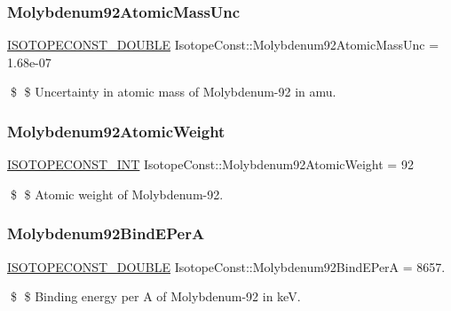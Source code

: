 \subsubsection{\texorpdfstring{Molybdenum92\+Atomic\+Mass\+Unc}{Molybdenum92AtomicMassUnc}}
{\footnotesize\ttfamily \mbox{\hyperlink{group___isotope_const-_macros_ga8f45a7272ce02c0b4c65c44636ed719a}{I\+S\+O\+T\+O\+P\+E\+C\+O\+N\+S\+T\+\_\+\+D\+O\+U\+B\+LE}} Isotope\+Const\+::\+Molybdenum92\+Atomic\+Mass\+Unc = 1.\+68e-\/07}

\$ \$ Uncertainty in atomic mass of Molybdenum-\/92 in amu. \mbox{\label{group___isotope_const-_molybdenum-_mo92_gadc9705ad39d4e885bc2bb4fad563d5ba}} 
\subsubsection{\texorpdfstring{Molybdenum92\+Atomic\+Weight}{Molybdenum92AtomicWeight}}
{\footnotesize\ttfamily \mbox{\hyperlink{group___isotope_const-_macros_ga5f18360b3e99483a35c32d789e62621c}{I\+S\+O\+T\+O\+P\+E\+C\+O\+N\+S\+T\+\_\+\+I\+NT}} Isotope\+Const\+::\+Molybdenum92\+Atomic\+Weight = 92}

\$ \$ Atomic weight of Molybdenum-\/92. \mbox{\label{group___isotope_const-_molybdenum-_mo92_ga6dbf9b16779246be7c2de275c8fbecee}} 
\subsubsection{\texorpdfstring{Molybdenum92\+Bind\+E\+PerA}{Molybdenum92BindEPerA}}
{\footnotesize\ttfamily \mbox{\hyperlink{group___isotope_const-_macros_ga8f45a7272ce02c0b4c65c44636ed719a}{I\+S\+O\+T\+O\+P\+E\+C\+O\+N\+S\+T\+\_\+\+D\+O\+U\+B\+LE}} Isotope\+Const\+::\+Molybdenum92\+Bind\+E\+PerA = 8657.}

\$ \$ Binding energy per A of Molybdenum-\/92 in keV. \mbox{\label{group___isotope_const-_molybdenum-_mo92_ga606b0387d580482291a11cd01eb34ed7}} 
